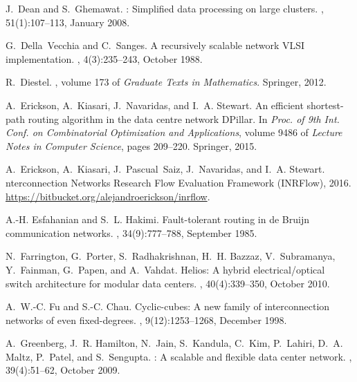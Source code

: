 \documentclass[]{amsart}
\begin{document}
\begin{thebibliography}{10}
J.~Dean and S.~Ghemawat.
: Simplified data processing on large clusters.
, 51(1):107--113, January 2008.

G.~Della~Vecchia and C.~Sanges.
\newblock A recursively scalable network {VLSI} implementation.
, 4(3):235--243, October
  1988.

R.~Diestel.
, volume 173 of {\em Graduate Texts in
  Mathematics}.
\newblock Springer, 2012.

A.~Erickson, A.~Kiasari, J.~Navaridas, and I.~A. Stewart.
\newblock An efficient shortest-path routing algorithm in the data centre
  network {DP}illar.
\newblock In {\em Proc. of 9th Int. Conf. on Combinatorial Optimization and
  Applications}, volume 9486 of {\em Lecture Notes in Computer Science}, pages
  209--220. Springer, 2015.

A.~Erickson, A.~Kiasari, J.~Pascual~Saiz, J.~Navaridas, and I.~A. Stewart.
nterconnection {N}etworks {R}esearch {F}low {E}valuation
  {F}ramework ({INRFlow}), 2016.
\newblock [Software] \url{https://bitbucket.org/alejandroerickson/inrflow}.

A.-H. Esfahanian and S.~L. Hakimi.
\newblock Fault-tolerant routing in de {B}ruijn communication networks.
, 34(9):777--788, September 1985.

N.~Farrington, G.~Porter, S.~Radhakrishnan, H.~H. Bazzaz, V.~Subramanya,
  Y.~Fainman, G.~Papen, and A.~Vahdat.
\newblock Helios: A hybrid electrical/optical switch architecture for modular
  data centers.
, 40(4):339--350, October
  2010.

A.~W.-C. Fu and S.-C. Chau.
\newblock Cyclic-cubes: A new family of interconnection networks of even
  fixed-degrees.
,
  9(12):1253--1268, December 1998.

A.~Greenberg, J.~R. Hamilton, N.~Jain, S.~Kandula, C.~Kim, P.~Lahiri, D.~A.
  Maltz, P.~Patel, and S.~Sengupta.
: A scalable and flexible data center network.
, 39(4):51--62, October
  2009.


\end{thebibliography}
\end{document}
